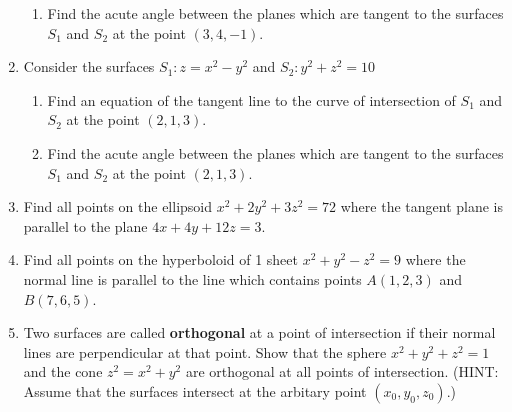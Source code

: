 \documentclass[12pt]{article}
\newif\ifans
\begin{document}
\begin{enumerate}
\begin{enumerate}
\item Find the acute angle between the planes which are tangent to the surfaces $S_1$ and $S_2$ at the point $(3,4,-1)$.

\ifans{\fbox{$\pi-\cos^{-1}\left(\frac{-3}{5\sqrt{2}}\right)$}} \fi

\end{enumerate}

\item Consider the surfaces $S_1: z=x^2-y^2$ and $S_2: y^2+z^2=10$

\begin{enumerate}

\item Find an equation of the tangent line to the curve of intersection of $S_1$ and $S_2$ at the point $(2,1,3)$.

\ifans{\fbox{$\overrightarrow{\ell}(t)=\langle 2,1,3\rangle+t\langle 5,12,-4 \rangle$}} \fi

\item Find the acute angle between the planes which are tangent to the surfaces $S_1$ and $S_2$ at the point $(2,1,3)$.

\ifans{\fbox{$\pi-\cos^{-1}\left(\frac{-10}{\sqrt{21}\sqrt{40}}\right)$}} \fi

\end{enumerate}

\item Find all points on the ellipsoid $x^2+2y^2+3z^2=72$ where the tangent plane is parallel to the plane $4x+4y+12z=3$.

\ifans{\fbox{$(6,3,6)$ and $(-6,-3,-6)$}} \fi

\item Find all points on the hyperboloid of 1 sheet $x^2+y^2-z^2=9$ where the normal line is parallel to the line which contains points $A(1,2,3)$ and $B(7,6,5)$.

\ifans{\fbox{$\left(\frac{3\sqrt{3}}{2},\sqrt{3},-\frac{\sqrt{3}}{2}\right)$ and $\left(-\frac{3\sqrt{3}}{2},-\sqrt{3},\frac{\sqrt{3}}{2}\right)$}} \fi

\item Two surfaces are called {\bf orthogonal} at a point of intersection if their normal lines are perpendicular at that point.  Show that the sphere $x^2+y^2+z^2=1$ and the cone $z^2=x^2+y^2$ are orthogonal at all points of intersection.  (HINT: Assume that the surfaces intersect at the arbitary point $(x_0,y_0,z_0)$.)


\end{enumerate}
\end{document}
